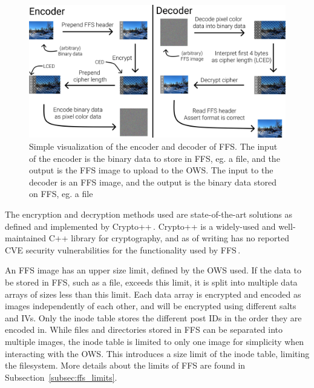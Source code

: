 \begin{figure}[!ht]
	\begin{center}
	  \includegraphics[width=1.0\textwidth]{figures/encoder_decoder.png}
	\end{center}
	\caption[Simple visualization of the encoder and decoder of \gls{FFS}]{Simple visualization of the encoder and decoder of \gls{FFS}. The input of the encoder is the binary data to store in \gls{FFS}, eg. a file, and the output is the \gls{FFS} image to upload to the \gls{OWS}. The input to the decoder is an \gls{FFS} image, and the output is the binary data stored on \gls{FFS}, eg. a file}
	\label{fig:file_enc_dec}
\end{figure}

The encryption and decryption methods used are \mbox{state-of-the-art} solutions as defined and implemented by Crypto++\,\cite{CryptoLibraryFree}. Crypto++ is a \mbox{widely-used} and \mbox{well-maintained} C++ library for cryptography, and as of writing has no reported CVE security vulnerabilities for the functionality used by \gls{FFS}\,\cite{CryptoppSecurityVulnerabilities}.

An \gls{FFS} image has an upper size limit, defined by the \gls{OWS} used. If the data to be stored in \gls{FFS}, such as a file, exceeds this limit, it is split into multiple data arrays of sizes less than this limit. Each data array is encrypted and encoded as images independently of each other, and will be encrypted using different salts and \gls{IV}s. Only the inode table stores the different post IDs in the order they are encoded in. While files and directories stored in \gls{FFS} can be separated into multiple images, the inode table is limited to only one image for simplicity when interacting with the \gls{OWS}. This introduces a size limit of the inode table, limiting the filesystem. More details about the limits of \gls{FFS} are found in Subsection~\ref{subsec:ffs_limits}.

